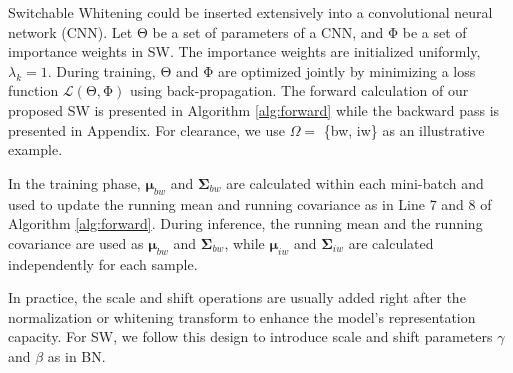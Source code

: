 \documentclass[10pt,twocolumn,letterpaper]{article}
\begin{document}
Switchable Whitening could be inserted extensively into a convolutional neural network (CNN).
Let $\mathrm{\Theta}$ be a set of parameters of a CNN, and $\mathrm{\Phi}$ be a set of importance weights in SW.
The importance weights are initialized uniformly, \eg $\lambda_k = 1$.
During training, $\mathrm{\Theta}$ and $\mathrm{\Phi}$ are optimized jointly by minimizing a loss function $\mathcal{L} (\mathrm{\Theta}, \mathrm{\Phi})$ using back-propagation.
The forward calculation of our proposed SW is presented in Algorithm \ref{alg:forward} while the backward pass is presented in Appendix.
For clearance, we use \(\Omega = \) \{bw, iw\} as an illustrative example.

In the training phase, \(\bm{\mu}_{bw}\) and \(\bm{\Sigma}_{bw}\) are calculated within each mini-batch and used to update the running mean and running covariance as in Line 7 and 8 of Algorithm \ref{alg:forward}.
During inference, the running mean and the running covariance are used as $\bm{\mu}_{bw}$ and $\bm{\Sigma}_{bw}$, while $\bm{\mu}_{iw}$ and $\bm{\Sigma}_{iw}$ are calculated independently for each sample.


In practice, the scale and shift operations are usually added right after the normalization or whitening transform to enhance the model's representation capacity.
For SW, we follow this design to introduce scale and shift parameters $\gamma$ and $\beta$ as in BN.
\end{document}
